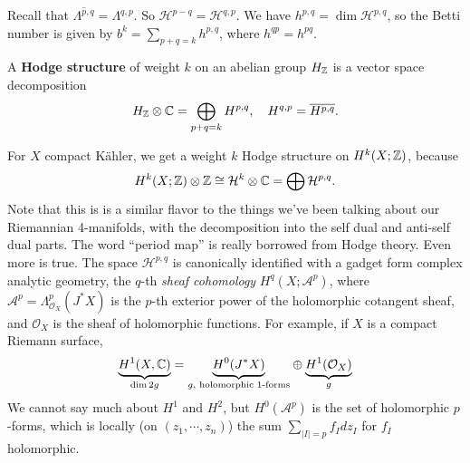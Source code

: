 Recall that $\overline{\Lambda^{p,q}}= \Lambda^{q,p}$. So $\mathcal H ^{p-q}= \mathcal H ^{q,p}$. We have $h ^{p,q}= \dim \mathcal H ^{p,q}$, so the Betti number is given by $b^k = \sum _{p+q=k}h ^{p,q}$, where $h ^{qp}= h ^{pq}$.
\begin{definition}[]
    A \textbf{Hodge structure} of weight $k$ on an abelian group $H _{\mathbb{Z}}$ is a vector space decomposition \[
    H _{\mathbb{Z}}\otimes \mathbb{C} = \bigoplus _{p+q=k}H ^{p,q}, \quad H ^{q,p}=\overline{ H ^{p,q}}.
    \] 
\end{definition}
For $X$ compact K\"ahler, we get a weight $k$ Hodge structure on $H^k(X;\mathbb{Z})$, because
\[
H^k (X;\mathbb{Z})\otimes \mathbb{Z} \cong \mathcal H^k \otimes \mathbb{C} = \bigoplus \mathcal H ^{p,q}.
\] Note that this is is a similar flavor to the things we've been talking about our Riemannian 4-manifolds, with the decomposition into the self dual and anti-self dual parts. The word ``period map'' is really borrowed from Hodge theory. 
Even more is true. The space $\mathcal H ^{p,q}$ is canonically identified with a gadget form complex analytic geometry, the $q$-th \emph{sheaf cohomology} $H^q(X;\mathcal A^p)$, where  $\mathcal A^p  = \Lambda_{\mathcal O_X}^p(J^*X)$ is the $p$-th exterior power of the holomorphic cotangent sheaf, and $\mathcal O_X$ is the sheaf of holomorphic functions. For example, if $X$ is a compact Riemann surface, \[
    \underset{\dim 2g}{\underbrace{H^1(X, \mathbb{C})}}  = \underset{g, \text{ holomorphic 1-forms}}{\underbrace{H^0(J^*X)}}  \oplus \underset{g}{\underbrace{H^1(\mathcal O_X)}} 
\] We cannot say much about $H^1$ and $H^2$, but $H^0(\mathcal A^p)$ is the set of holomorphic $p$-forms, which is locally (on $(z_1, \cdots ,z_n )$) the sum $\sum _{|I| = p}f_I dz_I$ for $f_I$ holomorphic.

